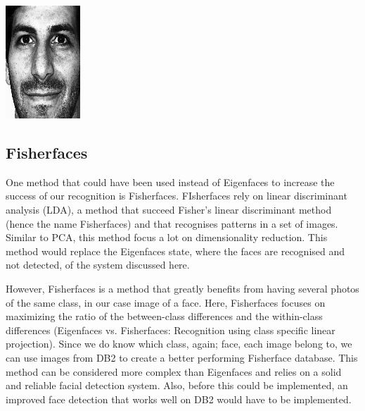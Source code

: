 \begin{Figure}
  \centering
    \includegraphics[width=0.5\columnwidth]{im9_normalized.jpg}
\end{Figure}


\subsection{Fisherfaces}
One method that could have been used instead of Eigenfaces to increase the success of our recognition is Fisherfaces. FIsherfaces rely on linear discriminant analysis (LDA), a method that succeed Fisher's linear discriminant method (hence the name Fisherfaces) and that recognises patterns in a set of images. Similar to PCA, this method focus a lot on dimensionality reduction. This method would replace the Eigenfaces state, where the faces are recognised and not detected, of the system discussed here.

However, Fisherfaces is a method that greatly benefits from having several photos of the same class, in our case image of a face. Here, Fisherfaces focuses on maximizing the ratio of the between-class differences and the within-class differences (Eigenfaces vs. Fisherfaces: Recognition using class specific linear projection). Since we do know which class, again; face, each image belong to, we can use images from DB2 to create a better performing Fisherface database. This method can be considered more complex than Eigenfaces and relies on a solid and reliable facial detection system. Also, before this could be implemented, an improved face detection that works well on DB2 would have to be implemented.

